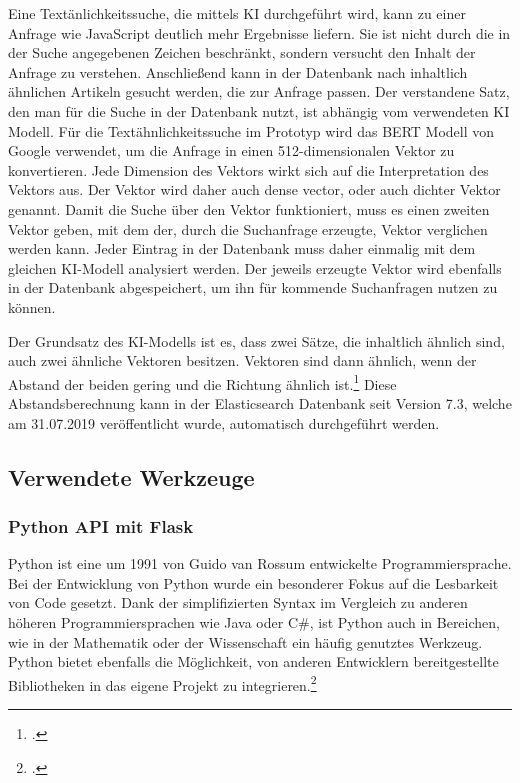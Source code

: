 Eine Textänlichkeitssuche, die mittels KI durchgeführt wird, kann zu einer Anfrage wie \glqq JavaScript\grqq{} deutlich mehr Ergebnisse liefern. Sie ist nicht durch die in der Suche angegebenen Zeichen beschränkt, sondern versucht den Inhalt der Anfrage zu verstehen. Anschließend kann in der Datenbank nach inhaltlich ähnlichen Artikeln gesucht werden, die zur Anfrage passen. Der \glqq verstandene\grqq{} Satz, den man für die Suche in der Datenbank nutzt, ist abhängig vom verwendeten KI Modell. Für die Textähnlichkeitssuche im Prototyp wird das BERT Modell von Google verwendet, um die Anfrage in einen 512-dimensionalen Vektor zu konvertieren. Jede Dimension des Vektors wirkt sich auf die Interpretation des Vektors aus. Der Vektor wird daher auch \glqq dense vector\grqq{}, oder auch dichter Vektor genannt. Damit die Suche über den Vektor funktioniert, muss es einen zweiten Vektor geben, mit dem der, durch die Suchanfrage erzeugte, Vektor verglichen werden kann. Jeder Eintrag in der Datenbank muss daher einmalig mit dem gleichen KI-Modell analysiert werden. Der jeweils erzeugte Vektor wird ebenfalls in der Datenbank abgespeichert, um ihn für kommende Suchanfragen nutzen zu können.

Der Grundsatz des KI-Modells ist es, dass zwei Sätze, die inhaltlich ähnlich sind, auch zwei ähnliche Vektoren besitzen. Vektoren sind dann ähnlich, wenn der Abstand der beiden gering und die Richtung ähnlich ist.\footcite{rahutomo2012semantic} Diese Abstandsberechnung kann in der Elasticsearch Datenbank seit Version 7.3, welche am 31.07.2019 veröffentlicht wurde, automatisch durchgeführt werden. 

\subsection{Verwendete Werkzeuge}
\subsubsection{Python API mit Flask}
Python ist eine um 1991 von Guido van Rossum entwickelte Programmiersprache. Bei der Entwicklung von Python wurde ein besonderer Fokus auf die Lesbarkeit von Code gesetzt. Dank der simplifizierten Syntax im Vergleich zu anderen höheren Programmiersprachen wie Java oder C\#, ist Python auch in Bereichen, wie in der Mathematik oder der Wissenschaft ein häufig genutztes Werkzeug. Python bietet ebenfalls die Möglichkeit, von anderen Entwicklern bereitgestellte Bibliotheken in das eigene Projekt zu integrieren.\footcite{python2021python} 

